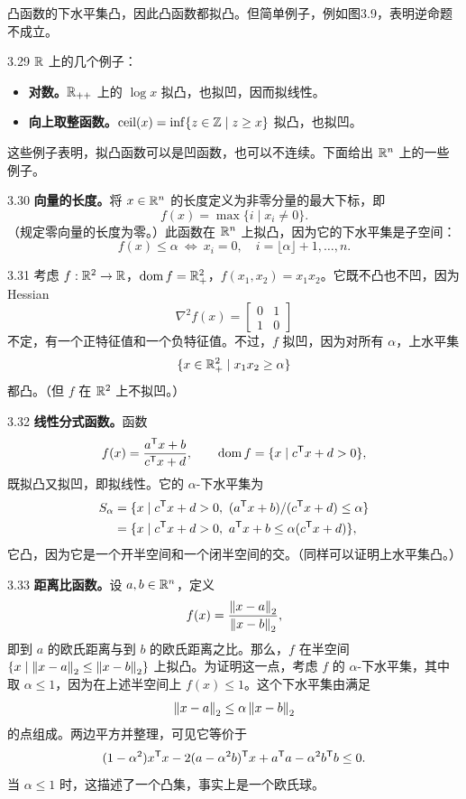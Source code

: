 凸函数的下水平集凸，因此凸函数都拟凸。但简单例子，例如图3.9，表明逆命题不成立。
\begin{origexample}{3.29}
$\mathbb R$ 上的几个例子：
\begin{itemize}
\item \textbf{对数。}$\mathbb R_{++}$ 上的 $\log x$ 拟凸，也拟凹，因而拟线性。
\item \textbf{向上取整函数。}$\operatorname{ceil}(x)=\inf\{z\in\mathbb Z\mid z\geq x\}$ 拟凸，也拟凹。
\end{itemize}
\end{origexample}
这些例子表明，拟凸函数可以是凹函数，也可以不连续。下面给出 $\mathbb R^n$ 上的一些例子。
\begin{origexample}{3.30}
\textbf{向量的长度。}将 $x\in\mathbb R^n$ 的长度定义为非零分量的最大下标，即
\[f(x)=\max\{i\mid x_i\ne0\}.\]
（规定零向量的长度为零。）此函数在 $\mathbb R^n$ 上拟凸，因为它的下水平集是子空间：
\[f(x)\leq\alpha\ \Longleftrightarrow\ x_i=0,\quad i=\lfloor\alpha\rfloor+1,\ldots,n.\]
\end{origexample}
\begin{origexample}{3.31}
考虑 $f:\mathbb R^2\to\mathbb R$，$\operatorname{dom} f=\mathbb R_+^2$，$f(x_1,x_2)=x_1x_2$。它既不凸也不凹，因为 Hessian
\[\nabla^2f(x)=\begin{bmatrix}0&1\\1&0\end{bmatrix}\]
不定，有一个正特征值和一个负特征值。不过，$f$ 拟凹，因为对所有 $\alpha$，上水平集
\[\{x\in\mathbb R_+^2\mid x_1x_2\geq\alpha\}\]
都凸。（但 $f$ 在 $\mathbb R^2$ 上不拟凹。）
\end{origexample}
\begin{origexample}{3.32}
\textbf{线性分式函数。}函数
\[f(x)=\frac{a^\mathsf T x+b}{c^\mathsf T x+d},\qquad\operatorname{dom} f=\{x\mid c^\mathsf T x+d>0\},\]
既拟凸又拟凹，即拟线性。它的 $\alpha$-下水平集为
\[
\begin{aligned}
 S_\alpha&=\{x\mid c^\mathsf T x+d>0,\ (a^\mathsf T x+b)/(c^\mathsf T x+d)\leq\alpha\}\\
 &=\{x\mid c^\mathsf T x+d>0,\ a^\mathsf T x+b\leq\alpha(c^\mathsf T x+d)\},
\end{aligned}
\]
它凸，因为它是一个开半空间和一个闭半空间的交。（同样可以证明上水平集凸。）
\end{origexample}
\begin{origexample}{3.33}
\textbf{距离比函数。}设 $a,b\in\mathbb R^n$，定义
\[f(x)=\frac{\left\lVert x-a\right\rVert_2}{\left\lVert x-b\right\rVert_2},\]
即到 $a$ 的欧氏距离与到 $b$ 的欧氏距离之比。那么，$f$ 在半空间 $\{x\mid\left\lVert x-a\right\rVert_2\leq\left\lVert x-b\right\rVert_2\}$ 上拟凸。为证明这一点，考虑 $f$ 的 $\alpha$-下水平集，其中取 $\alpha\leq1$，因为在上述半空间上 $f(x)\leq1$。这个下水平集由满足
\[\left\lVert x-a\right\rVert_2\leq\alpha\left\lVert x-b\right\rVert_2\]
的点组成。两边平方并整理，可见它等价于
\[(1-\alpha^2)x^\mathsf T x-2(a-\alpha^2b)^\mathsf T x+a^\mathsf T a-\alpha^2b^\mathsf T b\leq0.\]
当 $\alpha\leq1$ 时，这描述了一个凸集，事实上是一个欧氏球。
\end{origexample}
